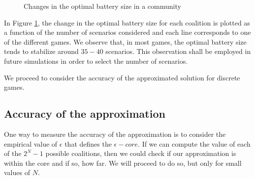 \begin{figure}[]
\centering
{}
  \caption{Changes in the optimal battery size in a community}
  \label{fig:stoc_change}
\end{figure}


In Figure \ref{fig:stoc_change}, the change in the optimal battery size for each coalition is plotted as a function of the number of scenarios considered and each line corresponds to one of the different games.
We observe that, in most games, the optimal battery size tends to stabilize around $35-40$ scenarios. This observation shall be employed in future simulations in order to select the number of scenarios. 

We proceed to consider the accuracy of the approximated solution for discrete games.

\subsection{Accuracy of the approximation}

One way to measure the accuracy of the approximation is to consider the empirical value of $\epsilon$ that defines the $\epsilon-core$. If we can compute the value of each of the $2^N - 1$ possible coalitions, then we could check if our approximation is within the core and if so, how far. We will proceed to do so, but only for small values of $N$.

